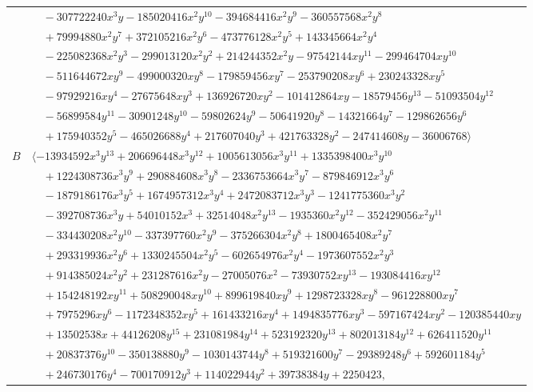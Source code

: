 \documentclass[11pt]{article}
\begin{document}
\begin{longtable}{@{}ll@{}}
 & $\quad -307722240x^{3}y-185020416x^{2}y^{10}-394684416x^{2}y^{9}-360557568x^{2}y^{8}$\\
 & $\quad +79994880x^{2}y^{7}+372105216x^{2}y^{6}-473776128x^{2}y^{5}+143345664x^{2}y^{4}$\\
 & $\quad -225082368x^{2}y^{3}-299013120x^{2}y^{2}+214244352x^{2}y-97542144xy^{11}-299464704xy^{10}$\\
 & $\quad -511644672xy^{9}-499000320xy^{8}-179859456xy^{7}-253790208xy^{6}+230243328xy^{5}$\\
 & $\quad -97929216xy^{4}-27675648xy^{3}+136926720xy^{2}-101412864xy-18579456y^{13}-51093504y^{12}$\\
 & $\quad -56899584y^{11}-30901248y^{10}-59802624y^{9}-50641920y^{8}-14321664y^{7}-129862656y^{6}$\\
 & $\quad +175940352y^{5}-465026688y^{4}+217607040y^{3}+421763328y^{2}-247414608y-36006768\rangle$\\
$B$ & $\langle -13934592x^{3}y^{13}+206696448x^{3}y^{12}+1005613056x^{3}y^{11}+1335398400x^{3}y^{10}$\\
 & $\quad +1224308736x^{3}y^{9}+290884608x^{3}y^{8}-2336753664x^{3}y^{7}-879846912x^{3}y^{6}$\\
 & $\quad -1879186176x^{3}y^{5}+1674957312x^{3}y^{4}+2472083712x^{3}y^{3}-1241775360x^{3}y^{2}$\\
 & $\quad -392708736x^{3}y+54010152x^{3}+32514048x^{2}y^{13}-1935360x^{2}y^{12}-352429056x^{2}y^{11}$\\
 & $\quad -334430208x^{2}y^{10}-337397760x^{2}y^{9}-375266304x^{2}y^{8}+1800465408x^{2}y^{7}$\\
 & $\quad +293319936x^{2}y^{6}+1330245504x^{2}y^{5}-602654976x^{2}y^{4}-1973607552x^{2}y^{3}$\\
 & $\quad +914385024x^{2}y^{2}+231287616x^{2}y-27005076x^{2}-73930752xy^{13}-193084416xy^{12}$\\
 & $\quad +154248192xy^{11}+508290048xy^{10}+899619840xy^{9}+1298723328xy^{8}-961228800xy^{7}$\\
 & $\quad +7975296xy^{6}-1172348352xy^{5}+161433216xy^{4}+1494835776xy^{3}-597167424xy^{2}-120385440xy$\\
 & $\quad +13502538x+44126208y^{15}+231081984y^{14}+523192320y^{13}+802013184y^{12}+626411520y^{11}$\\
 & $\quad +20837376y^{10}-350138880y^{9}-1030143744y^{8}+519321600y^{7}-29389248y^{6}+592601184y^{5}$\\
 & $\quad +246730176y^{4}-700170912y^{3}+114022944y^{2}+39738384y+2250423,$\\

\end{longtable}
\end{document}
